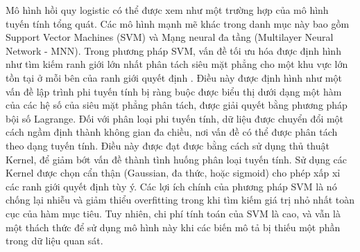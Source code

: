 \documentclass[utf8]{frontiersSCNS} %
\begin{document}
Mô hình hồi quy logistic có thể được xem như một trường hợp của mô hình tuyến tính tổng quát. Các mô hình mạnh mẽ khác trong danh mục này bao gồm Support Vector Machines (SVM) và Mạng neural đa tầng (Multilayer Neural Network - MNN). Trong phương pháp SVM, vấn đề tối ưu hóa được định hình như tìm kiếm ranh giới lớn nhất phân tách siêu mặt phẳng cho một khu vực lớn tồn tại ở mỗi bên của ranh giới quyết định \citep{Cortes1995}. Điều này được định hình như một vấn đề lập trình phi tuyến tính bị ràng buộc được biểu thị dưới dạng một hàm của các hệ số của siêu mặt phẳng phân tách, được giải quyết bằng phương pháp bội số Lagrange. Đối với phân loại phi tuyến tính, dữ liệu được chuyển đổi một cách ngầm định thành không gian đa chiều, nơi vấn đề có thể được phân tách theo dạng tuyến tính. Điều này được đạt được bằng cách sử dụng thủ thuật Kernel, để giảm bớt vấn đề thành tình huống phân loại tuyến tính. Sử dụng các Kernel được chọn cẩn thận (Gaussian, đa thức, hoặc sigmoid) cho phép xấp xỉ các ranh giới quyết định tùy ý. Các lợi ích chính của phương pháp SVM là nó chống lại nhiễu và giảm thiểu overfitting trong khi tìm kiếm giá trị nhỏ nhất toàn cục của hàm mục tiêu. Tuy nhiên, chi phí tính toán của SVM là cao, và vẫn là một thách thức để sử dụng mô hình này khi các biến mô tả bị thiếu một phần trong dữ liệu quan sát.
\end{document}
